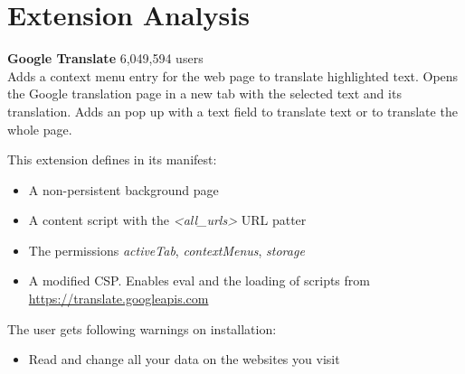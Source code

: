 \documentclass[article,colorback,accentcolor=tud9c,type=bsc]{tudthesis}
\let\stdsection\section
\renewcommand\section{\newpage\stdsection}
\begin{document}
\section{Extension Analysis}
       
	\textbf{Google Translate} 6,049,594 users \\ 
	Adds a context menu entry for the web page to translate highlighted text. Opens the Google translation page in a new tab with the selected text and its translation. Adds an pop up with a text field to translate text or to translate the whole page. \\

	
	\begin{minipage}[t]{0.5\textwidth}
		This extension defines in its manifest:
		\begin{itemize}
			\itemsep0em
			\item A non-persistent background page
			\item A content script with the \textit{\textless all\_urls\textgreater} URL patter
			\item The permissions \textit{activeTab}, \textit{contextMenus}, \textit{storage}
			\item A modified CSP. Enables eval and the loading of scripts from \url{https://translate.googleapis.com}
		\end{itemize}
	\end{minipage}
	\begin{minipage}[t]{0.45\textwidth}
		The user gets following warnings on installation:
		\begin{itemize}
			\item  Read and change all your data on the websites you visit
		\end{itemize}
	\end{minipage} \\


	
%	
%




\end{document}
